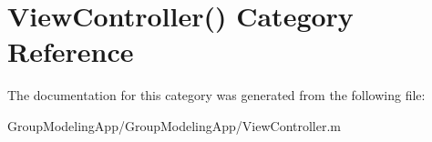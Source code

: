\hypertarget{category_view_controller_07_08}{\section{View\-Controller() Category Reference}
\label{category_view_controller_07_08}
}


The documentation for this category was generated from the following file\-:\begin{DoxyCompactItemize}
\item 
Group\-Modeling\-App/\-Group\-Modeling\-App/View\-Controller.\-m\end{DoxyCompactItemize}
